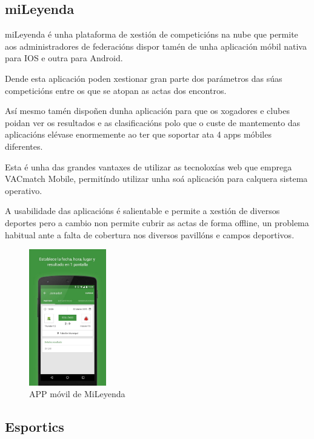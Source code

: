 \clearpage

    \subsection{miLeyenda}
  
    miLeyenda é unha plataforma de xestión de competicións na nube que permite 
aos administradores de federacións dispor tamén de unha aplicación móbil nativa 
para IOS e outra para Android.
    
    Dende esta aplicación poden xestionar gran parte dos parámetros das súas competicións 
entre os que se atopan as actas dos encontros.
  
    Así mesmo tamén dispoñen dunha aplicación para que os xogadores e clubes poidan ver 
os resultados e as clasificacións polo que o custe de mantemento das aplicacións elévase 
enormemente ao ter que soportar ata 4 apps móbiles diferentes.
    
    Esta é unha das grandes vantaxes de utilizar as tecnoloxías web que emprega VACmatch 
Mobile, permitíndo utilizar unha soá aplicación para calquera sistema operativo.

    A usabilidade das aplicacións é salientable e permite a xestión de diversos deportes 
pero a cambio non permite cubrir as actas de forma offline, un problema habitual ante a 
falta de cobertura nos diversos pavillóns e campos deportivos.
  
      \begin{figure}[h!]
	\begin{center}
	  \includegraphics[width=0.3\textwidth]{./img/mileyenda-app.png}
	  \caption{APP móvil de MiLeyenda}
	\end{center}
      \end{figure}

\clearpage

    \subsection{Esportics}

